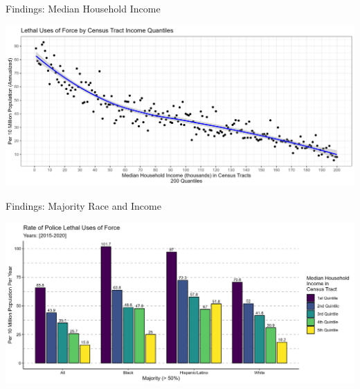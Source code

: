 \documentclass{beamer}
\begin{document}
\begin{frame}{Findings: Median Household Income}
	\begin{center}
		\includegraphics[width=\linewidth]{images/all_200}
	\end{center}
\end{frame}

\begin{frame}{Findings: Majority Race and Income}
	\begin{center}
		\includegraphics[width=\linewidth]{images/race_only_denom_race}
	\end{center}
\end{frame}
\end{document}
